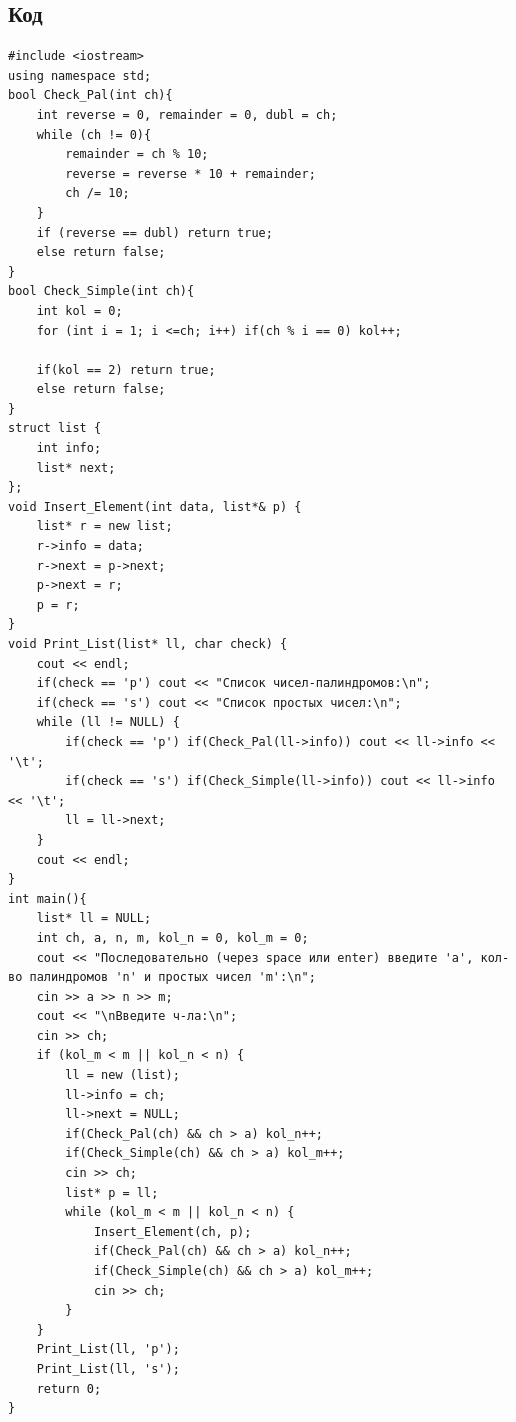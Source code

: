\documentclass[a4paper]{article}
\begin{document}
\subsection{Код}
\scriptsize
\begin{verbatim}
#include <iostream>
using namespace std;
bool Check_Pal(int ch){
    int reverse = 0, remainder = 0, dubl = ch;
    while (ch != 0){
        remainder = ch % 10;
        reverse = reverse * 10 + remainder;
        ch /= 10;
    }
    if (reverse == dubl) return true;
    else return false;
}
bool Check_Simple(int ch){
    int kol = 0;
    for (int i = 1; i <=ch; i++) if(ch % i == 0) kol++;
    
    if(kol == 2) return true;
    else return false;
}
struct list {
    int info;
    list* next;
};
void Insert_Element(int data, list*& p) {
    list* r = new list;
    r->info = data;
    r->next = p->next;
    p->next = r;
    p = r;
}
void Print_List(list* ll, char check) {
    cout << endl;
    if(check == 'p') cout << "Список чисел-палиндромов:\n";
    if(check == 's') cout << "Список простых чисел:\n";
    while (ll != NULL) {
        if(check == 'p') if(Check_Pal(ll->info)) cout << ll->info << '\t';
        if(check == 's') if(Check_Simple(ll->info)) cout << ll->info << '\t';
        ll = ll->next;
    }
    cout << endl;
}
int main(){
    list* ll = NULL;
    int ch, a, n, m, kol_n = 0, kol_m = 0;
    cout << "Последовательно (через space или enter) введите 'a', кол-во палиндромов 'n' и простых чисел 'm':\n";
    cin >> a >> n >> m;
    cout << "\nВведите ч-ла:\n";
    cin >> ch;
    if (kol_m < m || kol_n < n) {
        ll = new (list);
        ll->info = ch;
        ll->next = NULL;
        if(Check_Pal(ch) && ch > a) kol_n++;
        if(Check_Simple(ch) && ch > a) kol_m++;
        cin >> ch;
        list* p = ll;
        while (kol_m < m || kol_n < n) {
            Insert_Element(ch, p);
            if(Check_Pal(ch) && ch > a) kol_n++;
            if(Check_Simple(ch) && ch > a) kol_m++;
            cin >> ch;
        }
    }
    Print_List(ll, 'p');
    Print_List(ll, 's');
    return 0;
}
\end{verbatim}\normalsize
\end{document}
